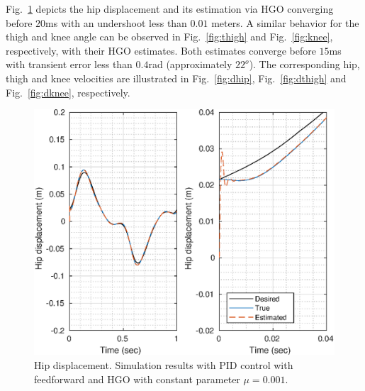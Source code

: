 \documentclass[letterpaper, 10 pt, conference]{ieeeconf}  %
\theoremstyle{plain}
\theoremstyle{definition}
\theoremstyle{remark}
\begin{document}
Fig.~\ref{fig:hip} depicts the hip displacement and its estimation via HGO converging before $20$ms with an undershoot less than $0.01$ meters. A similar behavior for the thigh and knee angle can be observed in Fig.~\ref{fig:thigh} and Fig.~\ref{fig:knee}, respectively, with their HGO estimates. Both estimates converge before $15$ms with transient error less than $0.4$rad (approximately  $22^o$). The corresponding hip, thigh and knee velocities are illustrated in Fig.~\ref{fig:dhip}, Fig.~\ref{fig:dthigh} and Fig.~\ref{fig:dknee}, respectively. 
%
%
%
%
%
%
%
%
%
\begin{figure}[h!]
\begin{center}
\includegraphics[width = 13cm]{Figs/q_hip_mu_1e-03.eps}
\caption{Hip displacement. Simulation results with PID control with feedforward and HGO with constant parameter $\mu=0.001$.}
\label{fig:hip}
\end{center}
\end{figure}
%
%
\end{document}
